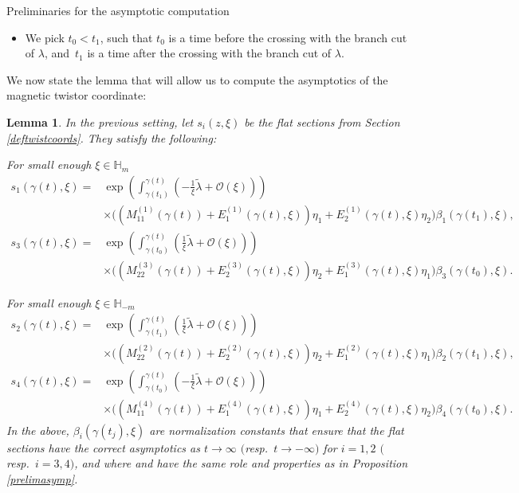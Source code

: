 \documentclass[11pt]{article}
\numberwithin{equation}{section}
\newtheorem{Lemma}[Theorem]{Lemma}
\numberwithin{equation}{section}
\begin{document}
\begin{subsubsection}{Preliminaries for the asymptotic computation}
\begin{itemize}
 \item We pick $t_0<t_1$, such that $t_0$ is a time before the crossing with the branch cut of $\lambda$, and~$ t_1$ is a time after the crossing with the branch cut of $\lambda$.
\end{itemize}

We now state the lemma that will allow us to compute the asymptotics of the magnetic twistor coordinate:

\begin{Lemma}\label{asympform} In the previous setting, let $s_i(z,\xi)$ be the flat sections from Section {\rm\ref{deftwistcoords}}. They satisfy the following:

For small enough $\xi \in \mathbb{H}_m$
\begin{align*}
 s_1(\gamma(t),\xi)={}& \exp \left(\int_{\gamma(t_1)}^{\gamma(t)}\left(-\frac{1}{\xi}\widetilde{\lambda}+\mathcal{O}(\xi)\right)\right)\\
 &\times
 \bigl((M_{11}^{(1)}(\gamma(t))+E^{(1)}_{1}(\gamma(t),\xi))\eta_1 + E^{(1)}_{2}(\gamma(t),\xi)\eta_2\bigr)\beta_1(\gamma(t_1),\xi),\\
 s_3(\gamma(t),\xi)={}& \exp \left(\int_{\gamma(t_0)}^{\gamma(t)}\left(\frac{1}{\xi}\widetilde{\lambda}+\mathcal{O}(\xi)\right)\right)\\
 &\times\bigl((M_{22}^{(3)}(\gamma(t))+E^{(3)}_{2}(\gamma(t),\xi))\eta_2 + E^{(3)}_{1}(\gamma(t),\xi)\eta_1\bigr)\beta_3(\gamma(t_0),\xi).
\end{align*}

For small enough $\xi \in \mathbb{H}_{-m}$
\begin{align*}
 s_2(\gamma(t),\xi)={}& \exp \left(\int_{\gamma(t_1)}^{\gamma(t)}\left(\frac{1}{\xi}\widetilde{\lambda}+\mathcal{O}(\xi)\right)\right)\\
 &\times
 \bigl((M_{22}^{(2)}(\gamma(t))+E^{(2)}_{2}(\gamma(t),\xi))\eta_2 + E^{(2)}_{1}(\gamma(t),\xi)\eta_1\bigr)\beta_2(\gamma(t_1),\xi),\\
 s_4(\gamma(t),\xi)={}& \exp \left(\int_{\gamma(t_0)}^{\gamma(t)}\left(-\frac{1}{\xi}\widetilde{\lambda}+\mathcal{O}(\xi)\right)\right)\\
 &\times
 \bigl((M_{11}^{(4)}(\gamma(t))+E^{(4)}_{1}(\gamma(t),\xi))\eta_1 + E^{(4)}_{2}(\gamma(t),\xi)\eta_2\bigr)\beta_4(\gamma(t_0),\xi).
\end{align*}
In the above, $\beta_i(\gamma(t_j),\xi)$ are normalization constants that ensure that the flat sections have the correct asymptotics as $t \to \infty$ $($resp.\ $t\to -\infty)$ for $i=1,2$ $($resp.\ $i=3,4)$, and where  and  have the same role and properties as in Proposition {\rm\ref{prelimasymp}}.


\end{Lemma}
\end{subsubsection}
\end{document}
